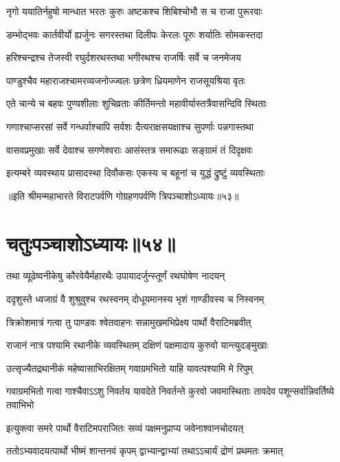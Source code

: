 \twolineshloka
{नृगो ययातिर्नहुषो मान्धात भरतः कुरुः}
{अष्टकश्च शिबिश्चोभौ स च राजा पुरूरवाः}


\twolineshloka
{डम्भोद्भवः कार्तवीर्यो ह्यर्जुनः सगरस्तथा}
{दिलीपः केरलः पूरुः शर्यातिः सोमकस्तदा}


\twolineshloka
{हरिश्चन्द्रश्च तेजस्वी रघुर्दशरथस्तथा}
{भगीरथश्च राजर्षिः सर्वे च जनमेजय}


\twolineshloka
{पाण्डुश्चैव महाराजश्चामरव्यजनोज्ज्वलः}
{छत्रेण ध्रियमाणेन राजसूयश्रिया वृतः}


\twolineshloka
{एते चान्ये च बहवः पुण्यशीलाः शुचिव्रताः}
{कीर्तिमन्तो महावीर्यास्तत्रैवासन्दिवि स्थिताः}


\twolineshloka
{गणाश्चाप्सरसां सर्वे गन्धर्वाश्चापि सर्वशः}
{दैत्यराक्षसयक्षाश्च सुपर्णाः पन्नगास्तथा}


\twolineshloka
{वासवप्रमुखाः सर्वे देवाश्च सगणेश्वराः}
{आसंस्तत्र समारूढाः सङ्ग्रामं तं दिदृक्षवः}


\twolineshloka
{इत्यम्बरे व्यवस्थाय प्रासादस्था दिवौकसः}
{एकस्य च बहूनां च युद्धं द्रुष्टुं व्यवस्थिताः}

॥इति श्रीमन्महाभारते विराटपर्वणि गोग्रहणपर्वणि त्रिपञ्चाशोऽध्यायः॥५३॥

\chapter{चतुःपञ्चाशोऽध्यायः॥५४॥}

\twolineshloka
{तथा व्यूढेष्वनीकेषु कौरवेयैर्महारथैः}
{उपायादर्जुन्स्तूर्णं रथघोषेण नादयन्}


\twolineshloka
{ददृशुस्ते ध्वजाग्रं वै शुश्रुवुश्च रथस्वनम्}
{दोधूयमानस्य भृशं गाण्डीवस्य च निस्वनम्}


\twolineshloka
{त्रिक्रोशमात्रं गत्वा तु पाण्डवः श्वेतवाहनः}
{सन्नामुखमभिप्रेक्ष्य पार्थो वैराटिमब्रवीत्}


\twolineshloka
{राजानं नात्र पश्यामि रथानीके व्यवस्थितम्}
{दक्षिणं पक्षमादाय कुरुवो यान्त्युदङ्मुखाः}


\twolineshloka
{उत्सृज्यैतद्रथानीकं महेष्वासाभिरक्षितम्}
{गवाग्रमभितो याहि यावत्पश्यामि मे रिपुम्}


\threelineshloka
{गवाग्रमभितो गत्वा गाश्चैवाऽऽशु निवर्तय}
{यावदेते निवर्तन्ते कुरवो जवमास्थिताः}
{तावदेव पशून्सर्वान्निवर्तिष्ये तवाभिभो}



\twolineshloka
{इत्युक्त्वा समरे पार्थो वैराटिमपराजितः}
{सव्यं पक्षमनुप्राप्य जवेनाश्वानचोदयत्}


\twolineshloka
{ततोऽभ्यवादयत्पार्थो भीष्मं शान्तनवं कृपम्}
{द्वाभ्यान्द्वाभ्यां तथाऽऽचार्यं द्रोणं प्रथमतः क्रमात्}


